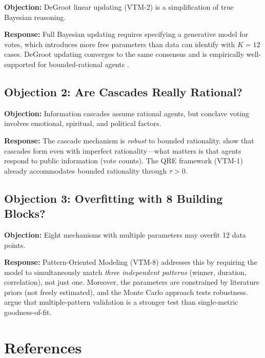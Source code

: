 \textbf{Objection:} DeGroot linear updating (VTM-2) is a simplification of true
Bayesian reasoning.

\textbf{Response:} Full Bayesian updating requires specifying a generative model
for votes, which introduces more free parameters than data can identify with $K=12$
cases. DeGroot updating converges to the same consensus
\citep{degroot1974reaching, chamley2004rational} and is empirically well-supported
for bounded-rational agents \citep{ambuhl2021belief}.

\subsection{Objection 2: Are Cascades Really Rational?}

\textbf{Objection:} Information cascades assume rational agents, but conclave voting
involves emotional, spiritual, and political factors.

\textbf{Response:} The cascade mechanism is \emph{robust} to bounded rationality.
\citet{bikhchandani1992theory} show that cascades form even with imperfect
rationality---what matters is that agents respond to public information (vote counts).
The QRE framework (VTM-1) already accommodates bounded rationality through $\tau > 0$.

\subsection{Objection 3: Overfitting with 8 Building Blocks?}

\textbf{Objection:} Eight mechanisms with multiple parameters may overfit 12 data points.

\textbf{Response:} Pattern-Oriented Modeling (VTM-8) addresses this by requiring
the model to simultaneously match \emph{three independent patterns} (winner, duration,
correlation), not just one. Moreover, the parameters are constrained by literature
priors (not freely estimated), and the Monte Carlo approach tests robustness.
\citet{grimm2005pattern} argue that multiple-pattern validation is a stronger test
than single-metric goodness-of-fit.


\section{References}
\label{sec:bp-references}

